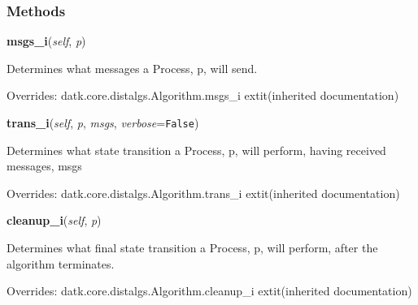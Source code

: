   \subsubsection{Methods}

    \vspace{0.5ex}

\hspace{.8\funcindent}\begin{boxedminipage}{\funcwidth}

    \raggedright \textbf{msgs\_i}(\textit{self}, \textit{p})

\setlength{\parskip}{2ex}
    Determines what messages a Process, p, will send.

\setlength{\parskip}{1ex}
      Overrides: datk.core.distalgs.Algorithm.msgs\_i 	extit{(inherited documentation)}

    \end{boxedminipage}

    \vspace{0.5ex}

\hspace{.8\funcindent}\begin{boxedminipage}{\funcwidth}

    \raggedright \textbf{trans\_i}(\textit{self}, \textit{p}, \textit{msgs}, \textit{verbose}={\tt False})

\setlength{\parskip}{2ex}
    Determines what state transition a Process, p, will perform, having 
    received messages, msgs

\setlength{\parskip}{1ex}
      Overrides: datk.core.distalgs.Algorithm.trans\_i 	extit{(inherited documentation)}

    \end{boxedminipage}

    \vspace{0.5ex}

\hspace{.8\funcindent}\begin{boxedminipage}{\funcwidth}

    \raggedright \textbf{cleanup\_i}(\textit{self}, \textit{p})

\setlength{\parskip}{2ex}
    Determines what final state transition a Process, p, will perform, 
    after the algorithm terminates.

\setlength{\parskip}{1ex}
      Overrides: datk.core.distalgs.Algorithm.cleanup\_i 	extit{(inherited documentation)}

    \end{boxedminipage}


